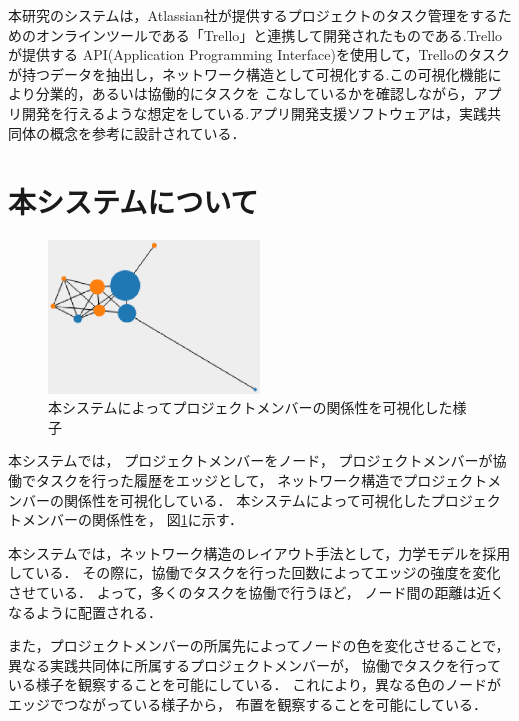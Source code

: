 \documentclass[submit,techrep]{ipsj}
\begin{document}
 本研究のシステムは，Atlassian社が提供するプロジェクトのタスク管理をするためのオンラインツールである「Trello」\cite{trello}と連携して開発されたものである.Trelloが提供する API(Application Programming Interface)を使用して，Trelloのタスクが持つデータを抽出し，ネットワーク構造として可視化する.この可視化機能により分業的，あるいは協働的にタスクを こなしているかを確認しながら，アプリ開発を行えるような想定をしている.アプリ開発支援ソフトウェアは，実践共同体の概念を参考に設計されている．




\section{本システムについて}
\label{system-map}

\begin{figure}[h]
  \centering
  \includegraphics[width=0.5\textwidth]{img/cop-map-graph.eps}
  \caption{本システムによってプロジェクトメンバーの関係性を可視化した様子}
  \label{cop-map-graph}
\end{figure}

本システムでは，
プロジェクトメンバーをノード，
プロジェクトメンバーが協働でタスクを行った履歴をエッジとして，
ネットワーク構造でプロジェクトメンバーの関係性を可視化している．
本システムによって可視化したプロジェクトメンバーの関係性を，
図\ref{cop-map-graph}に示す．

本システムでは，ネットワーク構造のレイアウト手法として，力学モデルを採用している．
その際に，協働でタスクを行った回数によってエッジの強度を変化させている．
よって，多くのタスクを協働で行うほど，
ノード間の距離は近くなるように配置される．

また，プロジェクトメンバーの所属先によってノードの色を変化させることで，
異なる実践共同体に所属するプロジェクトメンバーが，
協働でタスクを行っている様子を観察することを可能にしている．
これにより，異なる色のノードがエッジでつながっている様子から，
布置を観察することを可能にしている．
\end{document}

